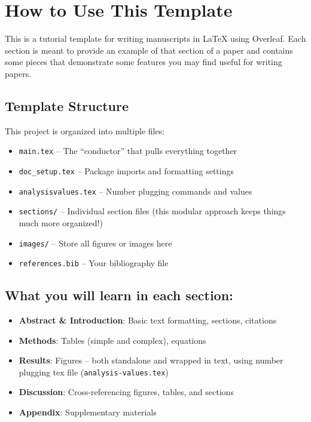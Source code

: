 \documentclass[../main.tex]{subfiles}
\begin{document}
\section*{How to Use This Template}

This is a tutorial template for writing manuscripts in \LaTeX{} using Overleaf. Each section is meant to provide an example of that section of a paper and contains some pieces that demonstrate some features you may find useful for writing papers.

\subsection*{Template Structure}

This project is organized into multiple files:

\begin{itemize}
    \item \texttt{main.tex} -- The ``conductor'' that pulls everything together
    \item \texttt{doc\_setup.tex} -- Package imports and formatting settings
    \item \texttt{analysis\-values.tex} -- Number plugging commands and values
    \item \texttt{sections/} -- Individual section files (this modular approach keeps things much more organized!)
    \item \texttt{images/} -- Store all figures or images here
    \item \texttt{references.bib} -- Your bibliography file
\end{itemize}

\bigskip %

\subsection*{What you will learn in each section:}

\begin{itemize}
    \item \textbf{Abstract \& Introduction}: Basic text formatting, sections, citations
    \item \textbf{Methods}: Tables (simple and complex), equations
    \item \textbf{Results}: Figures -- both standalone and wrapped in text, using number plugging tex file (\texttt{analysis-values.tex})
    \item \textbf{Discussion}: Cross-referencing figures, tables, and sections
    \item \textbf{Appendix}: Supplementary materials
\end{itemize}
\end{document}

